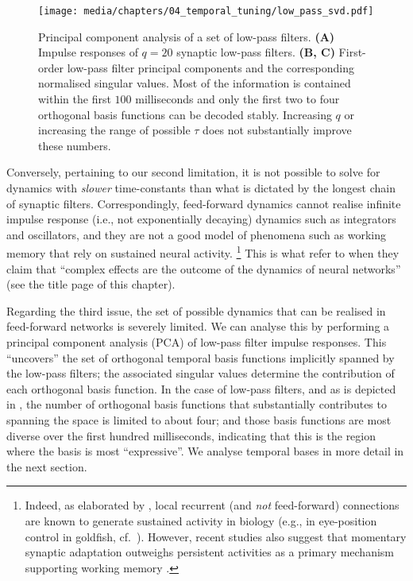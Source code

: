 \begin{figure}[p]
	\centering
	\texttt{[image: media/chapters/04\_temporal\_tuning/low\_pass\_svd.pdf]}
	\caption[Principal component analysis of a set of low-pass filters]{Principal component analysis of a set of low-pass filters. \textbf{(A)} Impulse responses of $q = 20$ synaptic low-pass filters. \textbf{(B, C)} First-order low-pass filter principal components and the corresponding normalised singular values. Most of the information is contained within the first $100$ milliseconds and only the first two to four orthogonal basis functions can be decoded stably. Increasing $q$ or increasing the range of possible $\tau$ does not substantially improve these numbers.}
	\label{fig:low_pass_svd}
\end{figure}

Conversely, pertaining to our second limitation, it is not possible to solve for dynamics with \emph{slower} time-constants than what is dictated by the longest chain of synaptic filters.
Correspondingly, feed-forward dynamics cannot realise infinite impulse response (i.e., not exponentially decaying) dynamics such as integrators and oscillators, and they are not a good model of phenomena such as working memory that rely on sustained neural activity.%
\footnote{Indeed, as elaborated by \citet[Section~8.4.1]{eliasmith2003neural}, local recurrent (and \emph{not} feed-forward) connections are known to generate sustained activity in biology (e.g., in eye-position control in goldfish, cf.~\cite{aksay2001vivo}).
However, recent studies also suggest that momentary synaptic adaptation outweighs persistent activities as a primary mechanism supporting working memory \citep{lundqvist2018working}.}
This is what \citet[Chapter~1, p.~4]{churchland1992computational} refer to when they claim that \enquote{complex effects are the outcome of the dynamics of neural networks} (see the title page of this chapter).

Regarding the third issue, the set of possible dynamics that can be realised in feed-forward networks is severely limited.
We can analyse this by performing a principal component analysis (PCA) of low-pass filter impulse responses.
This \enquote{uncovers} the set of orthogonal temporal basis functions implicitly spanned by the low-pass filters; the associated singular values determine the contribution of each orthogonal basis function.
In the case of low-pass filters, and as is depicted in , the number of orthogonal basis functions that  substantially contributes to spanning the space is limited to about four; and those basis functions are most diverse over the first hundred milliseconds, indicating that this is the region where the basis is most \enquote{expressive}.
We analyse temporal bases in more detail in the next section.

